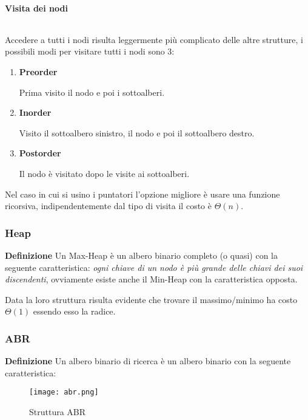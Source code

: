 \documentclass{article}
\begin{document}
\paragraph{Visita dei nodi}$\ $\newline

\noindent Accedere a tutti i nodi risulta leggermente più complicato delle altre strutture, i possibili modi per visitare tutti i nodi sono 3:
\begin{enumerate}
    \item \textbf{Preorder}

    Prima visito il nodo e poi i sottoalberi.
    
    \item \textbf{Inorder}

    Visito il sottoalbero sinistro, il nodo e poi il sottoalbero destro.
    
    \item \textbf{Postorder}

    Il nodo è visitato dopo le visite ai sottoalberi.
    
\end{enumerate}

\noindent Nel caso in cui si usino i puntatori l'opzione migliore è usare una funzione ricorsiva, indipendentemente dal tipo di visita il costo è $\Theta(n)$.

\subsubsection{Heap}\label{heap}

\textbf{Definizione} Un Max-Heap è un albero binario completo (o quasi) con la seguente caratteristica:\textit{ ogni chiave di un nodo è più grande delle chiavi dei suoi discendenti}, ovviamente esiste anche il Min-Heap con la caratteristica opposta.\newline

\noindent Data la loro struttura risulta evidente che trovare il massimo/minimo ha costo $\Theta(1)$ essendo esso la radice.

\subsubsection{ABR}

\textbf{Definizione} Un albero binario di ricerca è un albero binario con la seguente caratteristica:

\begin{figure}[ht]
    \centering
    \texttt{[image: abr.png]}
    \caption{Struttura ABR}
    \label{fig:abr}
\end{figure}
\end{document}
